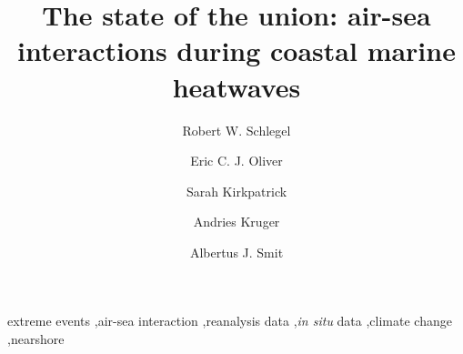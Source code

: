 \documentclass[a4paper,10pt,review]{elsarticle}
\begin{document}
\begin{frontmatter}

\title{The state of the union: air-sea interactions during coastal marine heatwaves}

\author[firstaddress]{Robert W. Schlegel}
\author[secondaddress,thirdaddress]{Eric C. J. Oliver}
\author[fourthaddress]{Sarah Kirkpatrick}
\author[fifthaddress,sixthaddress]{Andries Kruger}
\author[firstaddress]{Albertus J. Smit}



\address[firstaddress]{Department of Biodiversity and Conservation Biology, University of the Western Cape, Private Bag X17, Bellville 7535, South Africa}

\address[secondaddress]{ARC Centre of Excellence for Climate System Science, Australia}

\address[thirdaddress]{Institute for Marine and Antarctic Studies, University of Tasmania, Hobart, Australia}

\address[fourthaddress]{UWA Oceans Institute and School of Plant Biology, The University of Western Australia, Crawley, 6009 Western Australia, Australia}

\address[fifthaddress]{Climate Service, South African Weather Service, Pretoria, South Africa}

\address[sixthaddress]{Department of Geography, Geoinformatics and Meteorology, Faculty of Natural and Agricultural Sciences, University of Pretoria, South Africa}


\begin{abstract}
\end{abstract}

\begin{keyword}
extreme events \sep air-sea interaction \sep reanalysis data \sep \emph{in situ} data \sep climate change \sep nearshore
\end{keyword}

\end{frontmatter}
\end{document}
